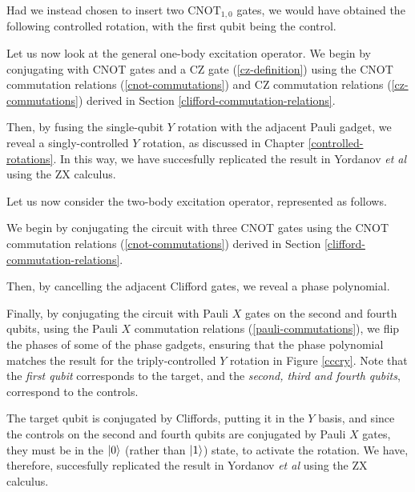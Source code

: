 
Had we instead chosen to insert two $\text{CNOT}_{1, 0}$ gates, we would have obtained the following controlled rotation, with the first qubit being the control.


Let us now look at the general one-body excitation operator. We begin by conjugating with CNOT gates and a CZ gate (\ref{cz-definition}) using the CNOT commutation relations (\ref{cnot-commutations}) and CZ commutation relations (\ref{cz-commutations}) derived in Section \ref{clifford-commutation-relations}.


Then, by fusing the single-qubit $Y$ rotation with the adjacent Pauli gadget, we reveal a singly-controlled $Y$ rotation, as discussed in Chapter \ref{controlled-rotations}. In this way, we have succesfully replicated the result in Yordanov \textit{et al} \cite{Yordanov2020} using the ZX calculus.


Let us now consider the two-body excitation operator, represented as follows.


We begin by conjugating the circuit with three CNOT gates using the CNOT commutation relations (\ref{cnot-commutations}) derived in Section \ref{clifford-commutation-relations}.


Then, by cancelling the adjacent Clifford gates, we reveal a phase polynomial.


Finally, by conjugating the circuit with Pauli $X$ gates on the second and fourth qubits, using the Pauli $X$ commutation relations (\ref{pauli-commutations}), we flip the phases of some of the phase gadgets, ensuring that the phase polynomial matches the result for the triply-controlled $Y$ rotation in Figure \ref{cccry}. Note that the \textit{first qubit} corresponds to the target, and the \textit{second, third and fourth qubits}, correspond to the controls.


The target qubit is conjugated by Cliffords, putting it in the $Y$ basis, and since the controls on the second and fourth qubits are conjugated by Pauli $X$ gates, they must be in the $\ket 0$ (rather than $\ket 1$) state, to activate the rotation. We have, therefore, succesfully replicated the result in Yordanov \textit{et al} \cite{Yordanov2020} using the ZX calculus.

